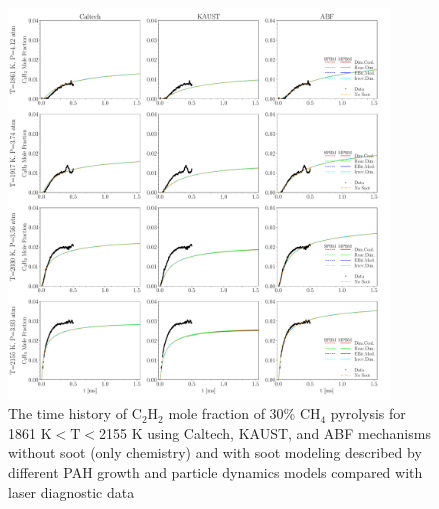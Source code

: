 \begin{figure}[H]
	\centering
	\includegraphics[width=0.9\textwidth]{Figures/Results/Shocktube/Stanford/june/30CH4_C2H2_mechs_s0.pdf}
	\caption{The time history of $\mathrm{C_2H_2}$ mole fraction of 30\% $\mathrm{CH_4}$ pyrolysis for 1861 K$<\mathrm{T}<$2155 K using Caltech, KAUST, and ABF mechanisms without soot (only chemistry) and with soot modeling described by different PAH growth and particle dynamics models compared with laser diagnostic data}
	\label{fig:shocktubest_30ch4_c2h2_0} 
\end{figure}


